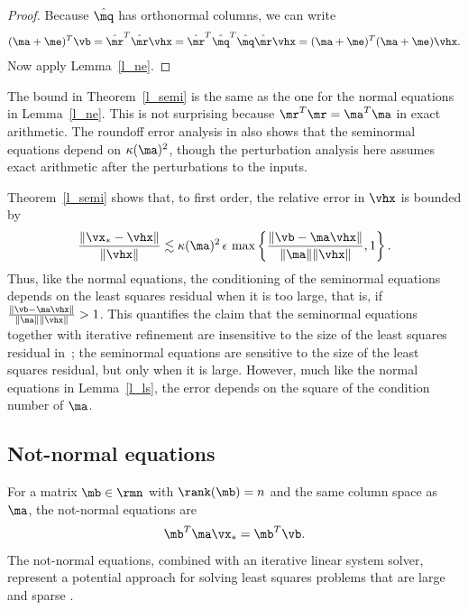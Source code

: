\documentclass[final]{siamart220329}%
\begin{document}
\begin{proof}
 Because $\hat{\mq}$ has orthonormal columns, we can write
 \begin{align*}
(\ma+\me)^T\vb=    \hat{\mr}^T\hat{\mr}\vhx
=    \hat{\mr}^T\hat{\mq}^T\hat{\mq}\hat{\mr}\vhx
= (\ma+\me)^T(\ma+\me)\vhx.   
 \end{align*}
Now apply Lemma~\ref{l_ne}.
\end{proof}

The bound in Theorem~\ref{l_semi} is the same as the one for the normal equations in Lemma~\ref{l_ne}. This is not surprising because $\mr^T\mr=\ma^T\ma$ in exact arithmetic.  The roundoff error analysis in \cite[Theorem 3.1]{BJORCK198731} also shows that the seminormal equations depend on $\kappa(\ma)^2$, though 
the perturbation analysis here assumes exact arithmetic after the 
perturbations to the inputs.

Theorem~\ref{l_semi} shows that, to first order, the relative error in $\vhx$ is bounded by
\begin{equation*}
\frac{\|\vx_*-\vhx\|}{\|\vhx\|}\lesssim \kappa(\ma)^2\,\epsilon\, 
\max\left\{\frac{\|\vb-\ma\vhx\|}{\|\ma\|\|\vhx\|}, 1\right\}.
\end{equation*}
Thus, like the normal equations, the conditioning of the seminormal equations
depends on the least squares residual when it is too large, that is, if
$\frac{\|\vb-\ma\vhx\|}{\|\ma\|\|\vhx\|}>1$. This quantifies the claim that the seminormal equations together with iterative refinement are insensitive to the size of the least squares residual in~\cite[Section 8]{carson2025}; the seminormal equations are sensitive to the size of the least squares residual, but only when it is large. However, much like the normal equations in Lemma~\ref{l_ls}, the error depends on the square of the condition number of $\ma$.

\subsection{Not-normal equations}\label{s_nne}
For a matrix  $\mb\in\rmn$ with $\rank(\mb)=n$ and  the same column space as $\ma$, the not-normal equations are~\cite{Wathennotnormal}
\begin{equation}\label{e_nne}
    \mb^T\ma\vx_*=\mb^T\vb.
\end{equation}
The not-normal equations, combined with an iterative linear system solver, represent a potential approach for solving least squares problems that are large and sparse \cite{Wathennotnormal}.
\end{document}

